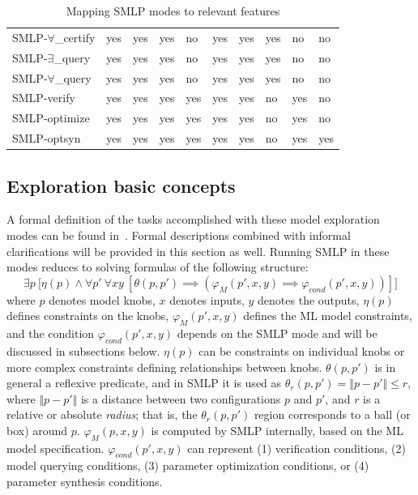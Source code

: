 \documentclass[a4paper,parskip=half]{article} %
\newcommand*\eqdef=
\begin{document}
\begin{table}
{\begin{tabular}{llllllllll}
SMLP-$\forall$\_certify &    yes &   yes &   yes &   no & yes &   yes &     yes &         no &         no \\
  SMLP-$\exists$\_query &    yes &   yes &   yes &   no & yes &   yes &     yes &         no &         no \\
  SMLP-$\forall$\_query &    yes &   yes &   yes &   no & yes &   yes &     yes &         no &         no \\
   SMLP-verify &    yes &   yes &   yes &  yes & yes &   yes &      no &        yes &         no \\
 SMLP-optimize &    yes &   yes &   yes &  yes & yes &   yes &      no &         yes &         no \\
   SMLP-optsyn &    yes &   yes &   yes &  yes & yes &   yes &      no &        yes &        yes \\
\bottomrule
\end{tabular}
}
\label{smlp:modes:features}
\caption{Mapping SMLP modes to relevant features}
\end{table}



\subsection{Exploration basic concepts}\label{sub:exploration:concepts}


A formal definition of the tasks accomplished with these model exploration modes can be found in~\cite{brausse2024smlp}. 
Formal descriptions combined with informal clarifications will be provided in this section as well. 
Running SMLP in these modes reduces to solving formulas of the following structure:
\begin{equation}\label{form:gear:final}
    \exists p ~\big[ \eta(p) \wedge
    \forall p'~
    \forall x y~[
    \theta(p,p') \implies (\varphi_M(p',x,y)  \implies  \varphi_{\mathit{cond}}(p',x,y))
    ]\big]
\end{equation}
where $p$ denotes model knobs, $x$ denotes inputs, $y$ denotes the outputs, $\eta(p)$ defines 
constraints on the knobs,  $\varphi_M(p',x,y)$ defines the ML model constraints, and the condition
$\varphi_{\mathit{cond}}(p',x,y)$ depends on the SMLP mode and will be discussed in subsections below.
$\eta(p)$ can be constraints on individual knobs or more complex constraints defining relationships between knobs.
$\theta(p,p')$ is in general a reflexive predicate, and in SMLP it is used as 
$\theta_r(p, p') \eqdef \Vert p - p' \Vert \leq r$, where  $\Vert p - p' \Vert$ is a distance between 
two configurations $p$ and $p'$, and $r$ is a relative or absolute \emph{radius}; that is, 
the $\theta_r(p, p')$ region corresponds to a ball (or box) around $p$.
$\varphi_M(p,x,y)$ is computed by SMLP internally, based on the ML model specification.
$\varphi_{\mathit{cond}}(p',x,y)$  can represent (1) verification conditions, (2) model querying conditions, 
(3) parameter optimization conditions, or (4) parameter synthesis conditions.
\end{document}
